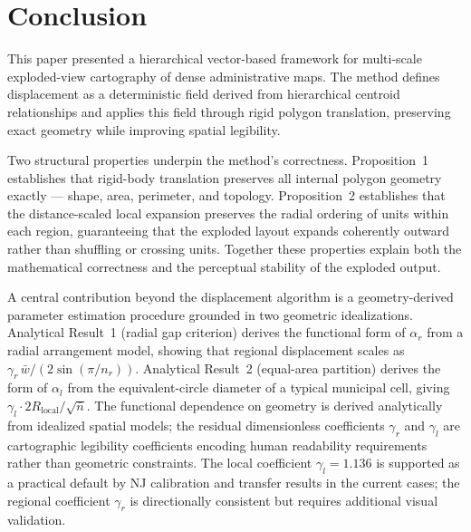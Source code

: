 \documentclass[12pt, a4paper]{article}
\numberwithin{equation}{section}
\begin{document}
\section{Conclusion}

This paper presented a hierarchical vector-based framework for multi-scale exploded-view cartography of dense administrative maps. The method defines displacement as a deterministic field derived from hierarchical centroid relationships and applies this field through rigid polygon translation, preserving exact geometry while improving spatial legibility.

Two structural properties underpin the method's correctness. Proposition~1 establishes that rigid-body translation preserves all internal polygon geometry exactly --- shape, area, perimeter, and topology. Proposition~2 establishes that the distance-scaled local expansion preserves the radial ordering of units within each region, guaranteeing that the exploded layout expands coherently outward rather than shuffling or crossing units. Together these properties explain both the mathematical correctness and the perceptual stability of the exploded output.

A central contribution beyond the displacement algorithm is a geometry-derived parameter estimation procedure grounded in two geometric idealizations. Analytical Result~1 (radial gap criterion) derives the functional form of $\alpha_r$ from a radial arrangement model, showing that regional displacement scales as $\gamma_r\,\bar{w} / (2\sin(\pi/n_r))$. Analytical Result~2 (equal-area partition) derives the form of $\alpha_l$ from the equivalent-circle diameter of a typical municipal cell, giving $\gamma_l \cdot 2R_{\text{local}}/\sqrt{\bar{n}}$. The functional dependence on geometry is derived analytically from idealized spatial models; the residual dimensionless coefficients $\gamma_r$ and $\gamma_l$ are cartographic legibility coefficients encoding human readability requirements rather than geometric constraints. The local coefficient $\gamma_l = 1.136$ is supported as a practical default by NJ calibration and transfer results in the current cases; the regional coefficient $\gamma_r$ is directionally consistent but requires additional visual validation.
\end{document}
